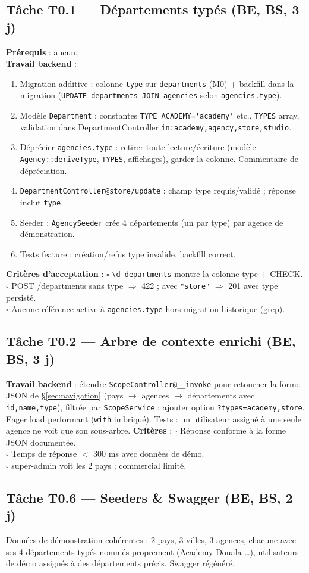 \documentclass[11pt,a4paper]{article}
\newcommand{\tache}[2]{\subsection{Tâche #1 --- #2}\label{task:#1}}
\newcommand{\critere}{$\square$ }
\begin{document}
\tache{T0.1}{Départements typés (BE, BS, 3 j)}
\textbf{Prérequis} : aucun. \\
\textbf{Travail backend} :
\begin{enumerate}[nosep]
  \item Migration additive : colonne \verb|type| sur \verb|departments| (M0) + backfill dans la migration (\verb|UPDATE departments JOIN agencies| selon \verb|agencies.type|).
  \item Modèle \verb|Department| : constantes \verb|TYPE_ACADEMY='academy'| etc., \verb|TYPES| array, validation dans DepartmentController \verb|in:academy,agency,store,studio|.
  \item Déprécier \verb|agencies.type| : retirer toute lecture/écriture (modèle \verb|Agency::deriveType|, \verb|TYPES|, affichages), garder la colonne. Commentaire de dépréciation.
  \item \verb|DepartmentController@store/update| : champ type requis/validé ; réponse inclut \verb|type|.
  \item Seeder : \verb|AgencySeeder| crée 4 départements (un par type) par agence de démonstration.
  \item Tests feature : création/refus type invalide, backfill correct.
\end{enumerate}
\textbf{Critères d'acceptation} :
\critere \verb|\d departments| montre la colonne type + CHECK. \\
\critere POST /departments sans type $\Rightarrow$ 422 ; avec \verb|"store"| $\Rightarrow$ 201 avec type persisté. \\
\critere Aucune référence active à \verb|agencies.type| hors migration historique (grep).

\tache{T0.2}{Arbre de contexte enrichi (BE, BS, 3 j)}
\textbf{Travail backend} : étendre \verb|ScopeController@__invoke| pour retourner la forme JSON de §\ref{sec:navigation} (pays $\rightarrow$ agences $\rightarrow$ départements avec \verb|id,name,type|), filtrée par \verb|ScopeService| ; ajouter option \verb|?types=academy,store|. Eager load performant (\verb|with| imbriqué). Tests : un utilisateur assigné à une seule agence ne voit que son sous-arbre.
\textbf{Critères} :
\critere Réponse conforme à la forme JSON documentée. \\
\critere Temps de réponse $<$ 300 ms avec données de démo. \\
\critere super-admin voit les 2 pays ; commercial limité.

\tache{T0.6}{Seeders \& Swagger (BE, BS, 2 j)}
Données de démonstration cohérentes : 2 pays, 3 villes, 3 agences, chacune avec ses 4 départements typés nommés proprement (\og Academy Douala \fg{}\ldots), utilisateurs de démo assignés à des départements précis. Swagger régénéré.
\end{document}
